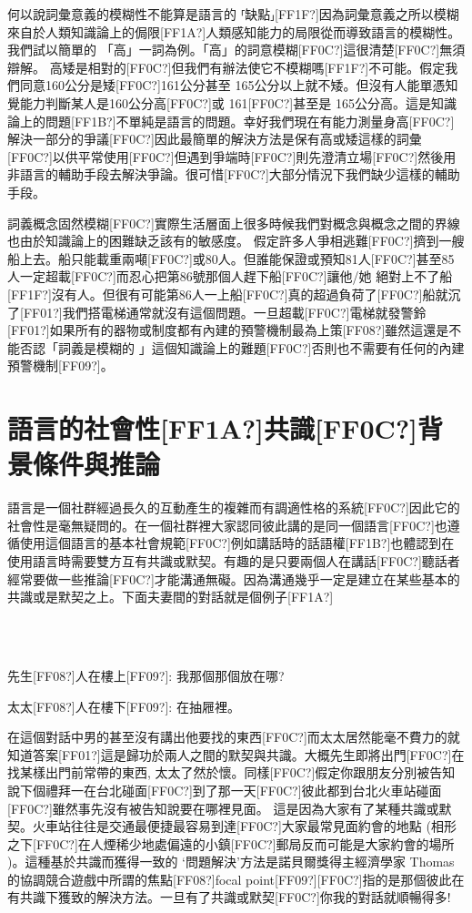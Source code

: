 何以說詞彙意義的模糊性不能算是語言的 ⸢缺點⸥[FF1F?]因為詞彙意義之所以模糊來自於人類知識論上的侷限[FF1A?]人類感知能力的局限從而導致語言的模糊性。我們試以簡單的 「高」一詞為例。「高」的詞意模糊[FF0C?]這很清楚[FF0C?]無須辯解。 高矮是相對的[FF0C?]但我們有辦法使它不模糊嗎[FF1F?]不可能。假定我們同意160公分是矮[FF0C?]161公分甚至 165公分以上就不矮。但沒有人能單憑知覺能力判斷某人是160公分高[FF0C?]或 161[FF0C?]甚至是 165公分高。這是知識論上的問題[FF1B?]不單純是語言的問題。幸好我們現在有能力測量身高[FF0C?]解決一部分的爭議[FF0C?]因此最簡單的解決方法是保有高或矮這樣的詞彙[FF0C?]以供平常使用[FF0C?]但遇到爭端時[FF0C?]則先澄清立場[FF0C?]然後用非語言的輔助手段去解決爭論。很可惜[FF0C?]大部分情況下我們缺少這樣的輔助手段。

詞義概念固然模糊[FF0C?]實際生活層面上很多時候我們對概念與概念之間的界線也由於知識論上的困難缺乏該有的敏感度。 假定許多人爭相逃難[FF0C?]擠到一艘船上去。船只能載重兩噸[FF0C?]或80人。但誰能保證或預知81人[FF0C?]甚至85人一定超載[FF0C?]而忍心把第86號那個人趕下船[FF0C?]讓他/她 絕對上不了船[FF1F?]沒有人。但很有可能第86人一上船[FF0C?]真的超過負荷了[FF0C?]船就沉了[FF01?]我們搭電梯通常就沒有這個問題。一旦超載[FF0C?]電梯就發警鈴[FF01?]如果所有的器物或制度都有內建的預警機制最為上策[FF08?]雖然這還是不能否認「詞義是模糊的 」這個知識論上的難題[FF0C?]否則也不需要有任何的內建預警機制[FF09?]。

\section{語言的社會性[FF1A?]共識[FF0C?]背景條件與推論}  %

語言是一個社群經過長久的互動產生的複雜而有調適性格的系統[FF0C?]因此它的社會性是毫無疑問的。在一個社群裡大家認同彼此講的是同一個語言[FF0C?]也遵循使用這個語言的基本社會規範[FF0C?]例如講話時的話語權[FF1B?]也體認到在使用語言時需要雙方互有共識或默契。有趣的是只要兩個人在講話[FF0C?]聽話者經常要做一些推論[FF0C?]才能溝通無礙。因為溝通幾乎一定是建立在某些基本的共識或是默契之上。下面夫妻間的對話就是個例子[FF1A?]

\ea%
\label{ex:key:12}
\gll\\
\\
\glt
\z

先生[FF08?]人在樓上[FF09?]: 我那個那個放在哪?

太太[FF08?]人在樓下[FF09?]:  在抽屜裡。

在這個對話中男的甚至沒有講出他要找的東西[FF0C?]而太太居然能毫不費力的就知道答案[FF01?]這是歸功於兩人之間的默契與共識。大概先生即將出門[FF0C?]在找某樣出門前常帶的東西, 太太了然於懷。同樣[FF0C?]假定你跟朋友分別被告知說下個禮拜一在台北碰面[FF0C?]到了那一天[FF0C?]彼此都到台北火車站碰面[FF0C?]雖然事先沒有被告知說要在哪裡見面。 這是因為大家有了某種共識或默契。火車站往往是交通最便捷最容易到達[FF0C?]大家最常見面約會的地點 (相形之下[FF0C?]在人煙稀少地處偏遠的小鎮[FF0C?]郵局反而可能是大家約會的場所 )。這種基於共識而獲得一致的 ‘問題解決’方法是諾貝爾獎得主經濟學家 Thomas \citet{Schelling1960} 的協調競合遊戲中所謂的焦點[FF08?]focal point[FF09?][FF0C?]指的是那個彼此在有共識下獲致的解決方法。一旦有了共識或默契[FF0C?]你我的對話就順暢得多!

